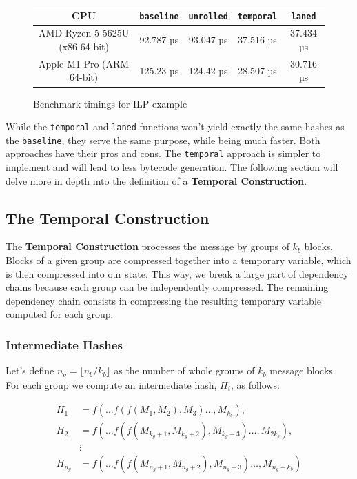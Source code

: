 \documentclass[10pt]{article}
\begin{document}
\begin{figure}[H]
\centering
\begin{tabular}{|c|c|c|c|c|}
\hline
CPU & \texttt{baseline} & \texttt{unrolled} & \texttt{temporal} & \texttt{laned} \\
\hline
AMD Ryzen 5 5625U (x86 64-bit) & 92.787 µs & 93.047 µs & 37.516 µs & 37.434 µs \\
Apple M1 Pro (ARM 64-bit) & 125.23 µs & 124.42 µs & 28.507 µs & 30.716 µs \\
\hline
\end{tabular}
\caption{Benchmark timings for ILP example}
\label{tab:your_table_label}
\end{figure}

While the \texttt{temporal} and \texttt{laned} functions won't yield exactly the same hashes as the \texttt{baseline}, they serve the same purpose, while being much faster.
Both approaches have their pros and cons. The \texttt{temporal} approach is simpler to implement and will lead to less bytecode generation.
The following section will delve more in depth into the definition of a \textbf{Temporal Construction}.

\clearpage
\subsection{The Temporal Construction}

The \textbf{Temporal Construction} processes the message by groups of \( k_b \) blocks. Blocks of a given group are compressed together into a temporary variable, which is then compressed into our state. This way, we break a large part of dependency chains because each group can be independently compressed. The remaining dependency chain consists in compressing the resulting temporary variable computed for each group.

\subsubsection{Intermediate Hashes}

Let's define \( n_g = \lfloor {n_b}/{k_b} \rfloor \) as the number of whole groups of \( k_b \) message blocks. \\
For each group we compute an intermediate hash, \( H_i \), as follows:

\begin{align*}
H_{1} &= f(\ldots f(f(M_1, M_2), M_3)\ldots, M_{k_b}), \\
H_{2} &= f(\ldots f(f(M_{k_g+1}, M_{k_g+2}), M_{k_g+3})\ldots, M_{2k_b}), \\
&\vdots \\
H_{n_g} &= f(\ldots f(f(M_{n_g+1}, M_{n_g+2}), M_{n_g+3})\ldots, M_{n_g+k_b})
\end{align*}
\end{document}
